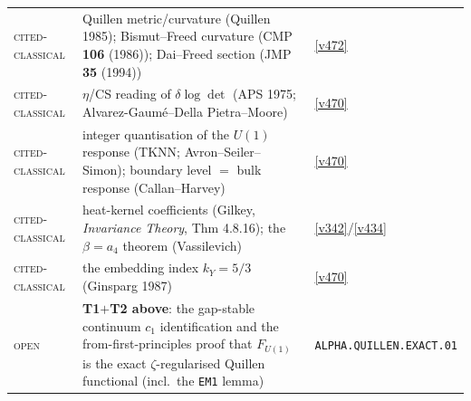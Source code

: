 \documentclass[11pt,a4paper]{article}
\begin{document}
\begin{center}
\begin{tabularx}{\linewidth}{@{}l>{\hsize=1.45\hsize\raggedright\arraybackslash}X>{\hsize=0.55\hsize\raggedright\arraybackslash}X@{}}
\textsc{cited-classical} & Quillen metric/curvature (Quillen 1985); Bismut--Freed curvature (CMP \textbf{106} (1986)); Dai--Freed section (JMP \textbf{35} (1994)) & \vref{v472} \\
\textsc{cited-classical} & $\eta$/CS reading of $\delta\log\det$ (APS 1975; Alvarez-Gaum\'e--Della Pietra--Moore) & \vref{v470} \\
\textsc{cited-classical} & integer quantisation of the $U(1)$ response (TKNN; Avron--Seiler--Simon); boundary level $=$ bulk response (Callan--Harvey) & \vref{v470} \\
\textsc{cited-classical} & heat-kernel coefficients (Gilkey, \emph{Invariance Theory}, Thm 4.8.16); the $\beta=a_4$ theorem (Vassilevich) & \vref{v342}/\vref{v434} \\
\textsc{cited-classical} & the embedding index $k_Y=5/3$ (Ginsparg 1987) & \vref{v470} \\
\textsc{open} & \textbf{T1$+$T2 above}: the gap-stable continuum $c_1$ identification and the from-first-principles proof that $F_{U(1)}$ is the exact $\zeta$-regularised Quillen functional (incl.\ the \texttt{EM1} lemma) & \texttt{ALPHA.QUILLEN.EXACT.01} \\
\bottomrule
\end{tabularx}
\end{center}
\end{document}
